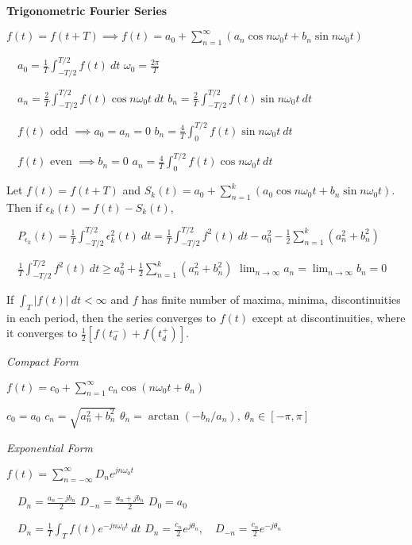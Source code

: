 \documentclass[twocolumn]{article}
\begin{document}
\vspace{-.5em}
\dotfill

\textbf{Trigonometric Fourier Series}

$f(t) = f(t+T) \implies f(t) = a_0 + \sum_{n=1}^\infty \left( a_n \cos n \omega_0 t + b_n \sin n \omega_0 t \right)$

$\quad a_0 = \frac{1}{T} \int_{-T/2}^{T/2} f(t)\ dt$ \hfill $\omega_0 = \frac{2\pi}{T}$

$\quad a_n = \frac{2}{T} \int_{-T/2}^{T/2} f(t) \cos n \omega_0 t\ dt$ \hfill $b_n = \frac{2}{T} \int_{-T/2}^{T/2} f(t) \sin n \omega_0 t\ dt$

$\quad f(t) \text{ odd } \implies a_0 = a_n = 0$ \hfill $b_n = \frac{4}{T} \int_0^{T/2} f(t) \sin n \omega_0 t\ dt$

$\quad f(t) \text{ even } \implies b_n = 0$ \hfill $a_n = \frac{4}{T} \int_0^{T/2} f(t) \cos n \omega_0 t\ dt$

Let $f(t) = f(t+T)$ and $S_k(t) = a_0 + \sum_{n=1}^k (a_0 \cos n \omega_0 t + b_n \sin n \omega_0 t)$. Then if $\epsilon_k(t) = f(t) - S_k(t)$,

$\quad P_{\epsilon_k}(t) = \frac{1}{T} \int_{-T/2}^{T/2} \epsilon_k^2(t)\ dt = \frac{1}{T} \int_{-T/2}^{T/2} f^2(t)\ dt - a_0^2 - \frac{1}{2} \sum_{n=1}^k (a_n^2 + b_n^2)$

$\quad \frac{1}{T} \int_{-T/2}^{T/2} f^2(t)\ dt \geq a_0^2 + \frac{1}{2} \sum_{n=1}^k (a_n^2 + b_n^2)$ \hfill $\lim_{n \to \infty} a_n = \lim_{n \to \infty} b_n = 0$

If $\int_T |f(t)|\ dt < \infty$ and $f$ has finite number of maxima, minima, discontinuities in each period, then the series converges to $f(t)$ except at discontinuities, where it converges to $\frac{1}{2} [f(t_d^-) + f(t_d^+)]$.

\dotfill

\textit{Compact Form}

$f(t) = c_0 + \sum_{n=1}^\infty c_n \cos(n \omega_0 t + \theta_n)$

$c_0 = a_0$ \hfill $c_n = \sqrt{a_n^2 + b_n^2}$ \hfill $\theta_n = \arctan(-b_n/a_n),\ \theta_n \in [-\pi, \pi]$

\newpage

\textit{Exponential Form}

$f(t) = \sum_{n=-\infty}^\infty D_n e^{jn\omega_0t}$

$\quad D_n = \frac{a_n - jb_n}{2}$ \hfill $D_{-n} = \frac{a_n + jb_n}{2}$ \hfill $D_0 = a_0$

$\quad D_n = \frac{1}{T} \int_T f(t) e^{-j n \omega_0 t}\ dt$ \hfill $D_n = \frac{c_n}{2} e^{j \theta_n}, \quad D_{-n} = \frac{c_n}{2} e^{-j \theta_n}$
\end{document}
